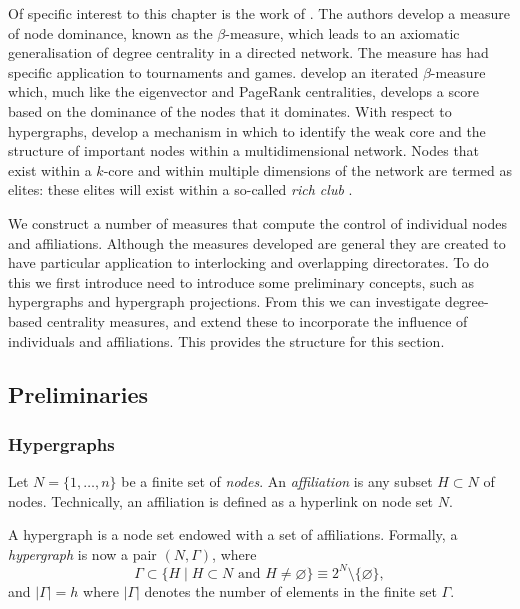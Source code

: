 Of specific interest to this chapter is the work of \citet{BrinkGilles1996, BrinkGilles2000}. The authors develop a measure of node dominance, known as the $\beta$-measure, which leads to an axiomatic generalisation of degree centrality in a directed network. The measure has had specific application to tournaments and games. \citet{BormBrink2002} develop an iterated $\beta$-measure which, much like the eigenvector and PageRank centralities, develops a score based on the dominance of the nodes that it dominates. With respect to hypergraphs, \citet{Corominas-MurtraThurner2014} develop a mechanism in which to identify the weak core and the structure of important nodes within a multidimensional network. Nodes that exist within a $k$-core and within multiple dimensions of the network are termed as elites: these elites will exist within a so-called \emph{rich club} \citep{Colizza2006}.

We construct a number of measures that compute the control of individual nodes and affiliations. Although the measures developed are general they are created to have particular application to interlocking and overlapping directorates. To do this we first introduce need to introduce some preliminary concepts, such as hypergraphs and hypergraph projections. From this we can investigate degree-based centrality measures, and extend these to incorporate the influence of individuals and affiliations. This provides the structure for this section.

\subsection{Preliminaries}

\subsubsection*{Hypergraphs}

Let $N = \{ 1, \ldots ,n \}$ be a finite set of \emph{nodes}. An \emph{affiliation} is any subset $H \subset N$ of nodes. Technically, an affiliation is defined as a hyperlink on node set $N$.

A hypergraph is a node set endowed with a set of affiliations. Formally, a \emph{hypergraph} is now a pair $(N, \Gamma )$, where
\begin{equation}
\Gamma \subset \{ H \mid H \subset N \mbox{ and } H \neq \varnothing \} \equiv 2^N \setminus \{\varnothing\} ,
\end{equation}
and $| \Gamma | = h$ where $| \Gamma |$ denotes the number of elements in the finite set $\Gamma$.

